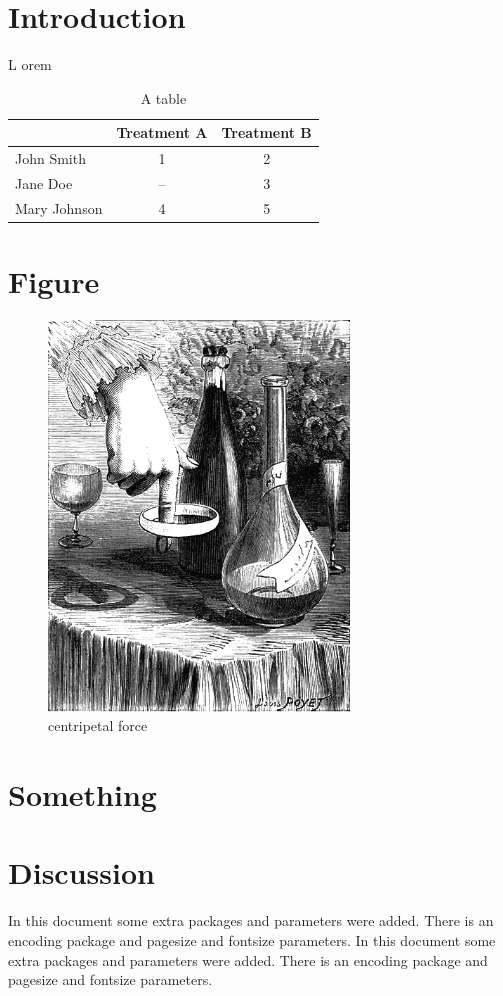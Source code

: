 \section{Introduction}
\renewcommand{\LettrineFontHook}{\usefont{U}{GoudyIn}{xl}{n}\color{red!30!black}}
\lettrine[lines=5,,loversize=-0.05, lraise=.05]{L}{}
orem \lipsum[1]

\begin{table}[ht]
\centering
\caption{A table}
\begin{tabular}[ht]{lcc}
\toprule
&Treatment A&Treatment B\\
\midrule
John Smith&1&2\\
Jane Doe&--&3\\
Mary Johnson&4&5\\
\bottomrule
\end{tabular}
\end{table}%

\lipsum[5]

\section{Figure}

\lipsum[1-2]

\begin{figure}[h]
\centering
\includegraphics[width=80mm]{image/centforce.png}
\caption{centripetal force}
\end{figure}

\lipsum[3-4]

\section{Something}

\lipsum[5-8]

\section{Discussion}

\lipsum[9-14]

In this document some extra packages and parameters
were added. There is an encoding package
and pagesize and fontsize parameters.
In this document some extra packages and parameters
were added. There is an encoding package
and pagesize \textcite{Albarella2001} and fontsize parameters.
